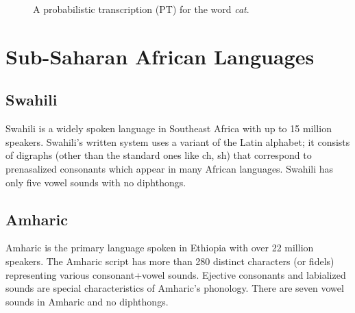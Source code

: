 \documentclass[a4paper]{article}
\newcommand{\mytikzscale}{0.9}
\newcommand{\myvspacefig}{\vspace{-4mm}}
\begin{document}
\begin{figure}
\begin{subfigure}
  \myvspacefig
  \caption{A probabilistic transcription (PT) for the word \emph{cat}.}
  \label{fig:pt}
  \end{subfigure}%
  \vspace{-1mm}
\end{figure}

\section{Sub-Saharan African Languages}  \vspace{-1mm}
\label{sec:Sub-Saharan African Languages}
\subsection{Swahili} 
Swahili is a widely spoken language in Southeast Africa with up to 15 million speakers. Swahili's written system uses a variant of the Latin alphabet; it consists of digraphs (other than the standard ones like ch, sh) that correspond to prenasalized consonants which appear in many African languages. Swahili has only five vowel sounds with no diphthongs. 

\subsection{Amharic}  
Amharic is the primary language spoken in Ethiopia with over 22 million speakers. The Amharic script has more than 280 distinct characters (or fidels) representing various consonant+vowel sounds. Ejective consonants and labialized sounds are special characteristics of Amharic's phonology. There are seven vowel sounds in Amharic and no diphthongs. 
\end{document}
